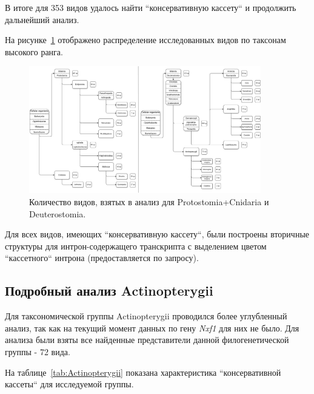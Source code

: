 В итоге для 353 видов удалось найти ``консервативную кассету`` и продолжить дальнейший анализ.


На рисунке~\ref{fig:tree_summary} отображено распределение исследованных видов по таксонам высокого ранга.

\begin{figure}[h] %
    \centering
    \includegraphics[width=0.9\textwidth]{images/Tree_summary}
    \caption{Количество видов, взятых в анализ для Protostomia+Cnidaria и Deuterostomia.}
    \label{fig:tree_summary}
\end{figure}

Для всех видов, имеющих ``консервативную кассету``, были построены вторичные структуры для интрон-содержащего транскрипта с выделением цветом ``кассетного`` интрона (предоставляется по запросу).


\subsection{Подробный анализ Actinopterygii}

Для таксономической группы Actinopterygii проводился более углубленный анализ, так как на текущий момент данных по гену \textit{Nxf1} для них не было.
Для анализа были взяты все найденные представители данной филогенетической группы - 72 вида.


На таблице~\ref{tab:Actinopterygii} показана характеристика ``консервативной кассеты`` для исследуемой группы.

